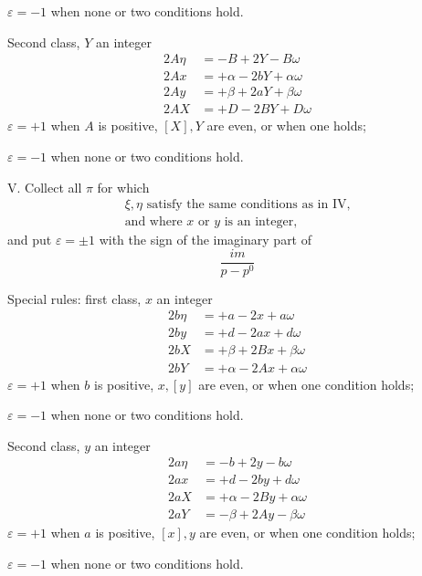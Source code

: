 $\varepsilon=-1$ when none or two conditions hold.

Second class, $Y$ an integer
\[
\begin{aligned}
2A\eta&=-B+2Y-B\omega\\
2Ax&=+\alpha-2bY+\alpha\omega\\
2Ay&=+\beta+2aY+\beta\omega\\
2AX&=+D-2BY+D\omega
\end{aligned}
\]
\noindent $\varepsilon=+1$ when $A$ is positive, $[X],Y$ are even, or when one holds;\par
\noindent $\varepsilon=-1$ when none or two conditions hold.

\clearpage
{}
V. Collect all $\pi$ for which
\[
\begin{gathered}
\xi,\eta\text{ satisfy the same conditions as in IV,}\\
\text{and where }x\text{ or }y\text{ is an integer,}
\end{gathered}
\]
and put $\varepsilon=\pm1$ with the sign of the imaginary part of
\[
\frac{im}{p-p^0}
\]

Special rules: first class, $x$ an integer
\[
\begin{aligned}
2b\eta&=+a-2x+a\omega\\
2by&=+d-2ax+d\omega\\
2bX&=+\beta+2Bx+\beta\omega\\
2bY&=+\alpha-2Ax+\alpha\omega
\end{aligned}
\]
\noindent $\varepsilon=+1$ when $b$ is positive, $x,[y]$ are even, or when one condition holds;\par
\noindent $\varepsilon=-1$ when none or two conditions hold.

Second class, $y$ an integer
\[
\begin{aligned}
2a\eta&=-b+2y-b\omega\\
2ax&=+d-2by+d\omega\\
2aX&=+\alpha-2By+\alpha\omega\\
2aY&=-\beta+2Ay-\beta\omega
\end{aligned}
\]
\noindent $\varepsilon=+1$ when $a$ is positive, $[x],y$ are even, or when one condition holds;\par
\noindent $\varepsilon=-1$ when none or two conditions hold.
